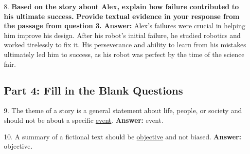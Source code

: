 \documentclass[12pt]{article}
\begin{document}
\vspace{1cm}
8. \textbf{Based on the story about Alex, explain how failure contributed to his ultimate success. Provide textual evidence in your response from the passage from question 3.}  
\textbf{Answer:} Alex’s failures were crucial in helping him improve his design. After his robot’s initial failure, he studied robotics and worked tirelessly to fix it. His perseverance and ability to learn from his mistakes ultimately led him to success, as his robot was perfect by the time of the science fair.

\subsection*{Part 4: Fill in the Blank Questions}

9. The theme of a story is a general statement about life, people, or society and should not be about a specific \underline{event}.  
\textbf{Answer:} event.

10. A summary of a fictional text should be \underline{objective} and not biased.  
\textbf{Answer:} objective.
\end{document}
